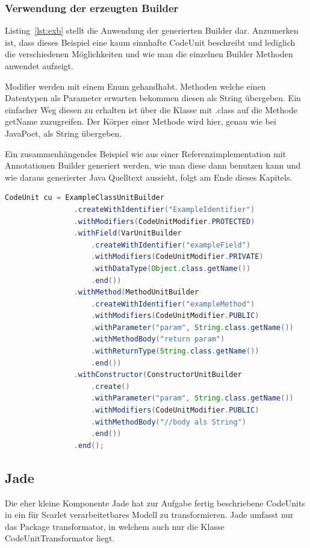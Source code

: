 \documentclass[12pt,oneside,a4paper,parskip]{scrbook}
\begin{document}
\subsubsection{Verwendung der erzeugten Builder}

Listing~\ref{lst:exb} stellt die Anwendung der generierten Builder dar. Anzumerken ist, dass dieses Beispiel eine kaum sinnhafte CodeUnit beschreibt und lediglich die verschiedenen Möglichkeiten und wie man die einzelnen Builder Methoden anwendet aufzeigt.

Modifier werden mit einem Enum gehandhabt. Methoden welche einen Datentypen als Parameter erwarten bekommen diesen als String übergeben. Ein einfacher Weg diesen zu erhalten ist über die Klasse mit .class auf die Methode getName zuzugreifen. Der Körper einer Methode wird hier, genau wie bei JavaPoet, als String übergeben.

Ein zusammenhängendes Beispiel wie aus einer Referenzimplementation mit Annotationen Builder generiert werden, wie man diese dann benutzen kann und wie daraus generierter Java Quelltext aussieht, folgt am Ende dieses Kapitels.

\begin{lstlisting}[label=lst:exb,
language=java,
firstnumber=1,
caption=Quelltext zur Verwendung verschiedener erzeugter Builder.]
CodeUnit cu = ExampleClassUnitBuilder
				.createWithIdentifier("ExampleIdentifier")
				.withModifiers(CodeUnitModifier.PROTECTED)
				.withField(VarUnitBuilder
					.createWithIdentifier("exampleField")
					.withModifiers(CodeUnitModifier.PRIVATE)
					.withDataType(Object.class.getName())
					.end())
				.withMethod(MethodUnitBuilder
					.createWithIdentifier("exampleMethod")
					.withModifiers(CodeUnitModifier.PUBLIC)
					.withParameter("param", String.class.getName())
					.withMethodBody("return param")
					.withReturnType(String.class.getName())
					.end())
				.withConstructor(ConstructorUnitBuilder
					.create()
					.withParameter("param", String.class.getName())
					.withModifiers(CodeUnitModifier.PUBLIC)
					.withMethodBody("//body als String")
					.end())
				.end();
\end{lstlisting}

\subsection{Jade}

Die eher kleine Komponente Jade hat zur Aufgabe fertig beschriebene CodeUnits in ein für Scarlet verarbeitetbares Modell zu transformieren. Jade umfasst nur das Package transformator, in welchem auch nur die Klasse CodeUnitTransformator liegt.
\end{document}
